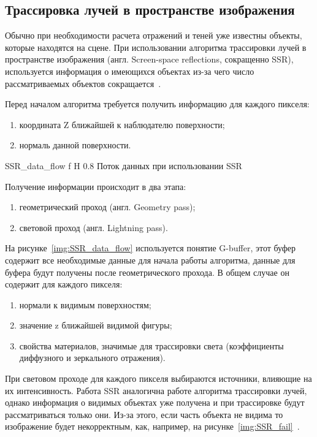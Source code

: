 \subsection{Трассировка лучей в пространстве изображения}
Обычно при необходимости расчета отражений и теней уже известны объекты, которые находятся на сцене. При использовании алгоритма трассировки лучей в пространстве изображения (англ. Screen-space reflections, сокращенно SSR), используется информация о имеющихся
объектах из-за чего число рассматриваемых объектов сокращается~\cite{SSR}.

Перед началом алгоритма требуется получить информацию для каждого пикселя:
\begin{enumerate}
	\item координата Z ближайшей к наблюдателю поверхности;
	\item нормаль данной поверхности.
\end{enumerate}



{SSR_data_flow} %
{f} %
{H} %
{0.8\textwidth} %
{Поток данных при использовании SSR} %



Получение информации происходит в два этапа:
\begin{enumerate}
	\item геометрический проход (англ. Geometry pass);
	\item световой проход (англ. Lightning pass).
\end{enumerate}

На рисунке~\ref{img:SSR_data_flow} используется понятие G-buffer, этот буфер содержит все необходимые данные для начала работы алгоритма, данные для буфера
будут получены после геометрического прохода. В общем случае он содержит для каждого пикселя:
\begin{enumerate}
	\item нормали к видимым поверхностям;
	\item значение z ближайшей видимой фигуры;
	\item свойства материалов, значимые для трассировки света (коэффициенты диффузного и зеркального отражения).
\end{enumerate}
При световом проходе для каждого пикселя выбираются источники, влияющие на их интенсивность.
Работа SSR аналогична работе алгоритма трассировки лучей, однако информация о видимых объектах уже получена и при трассировке будут рассматриваться только они.
Из-за этого, если часть объекта не видима то изображение будет некорректным, как, например, на рисунке~\ref{img:SSR_fail}~\cite{SSR,reflexion_types}.


